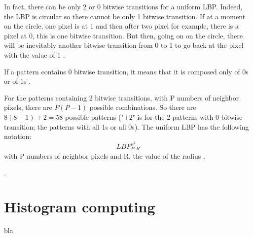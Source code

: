 \noindent In fact, there can be only 2 or 0 bitwise transitions for a uniform LBP. Indeed, the LBP is circular so there cannot be only 1 bitwise transition. If at a moment on the circle, one pixel is at 1 and then after two pixel for example, there is a pixel at 0, this is one bitwise transition. But then, going on on the circle, there will be inevitably another bitwise transition from 0 to 1 to go back at the pixel with the value of 1 \cite{GAN08}.
\newline

\noindent If a pattern contains 0 bitwise transition, it means that it is composed only of 0s or of 1s \cite{GAN08}.
\newline

\noindent For the patterns containing 2 bitwise transitions, with P numbers of neighbor pixels, there are $ P(P - 1) $ possible combinations. So there are $ 8(8 - 1) + 2 =58 $ possible patterns ("$ + 2 $" is for the 2 patterns with 0 bitwise transition; the patterns with all 1s or all 0s). The uniform LBP has the following notation: \[ LBP_{P,R}^{u^2} \] with P numbers of neighbor pixels and R, the value of the radius \cite{GAN08}.
\newline

\noindent  \cite{GAN08}.
\newline

\section{Histogram computing}

\vspace{\baselineskip}
\noindent bla
\newline
